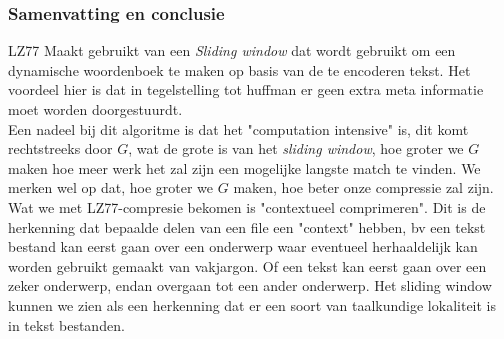 \documentclass[10pt,a4paper]{report}
\begin{document}
\subsubsection*{Samenvatting en conclusie}
LZ77 Maakt gebruikt van een \emph{Sliding window} dat wordt gebruikt om een dynamische woordenboek te maken op basis van de te encoderen tekst. Het voordeel hier is dat in tegelstelling tot huffman er geen extra meta informatie moet worden doorgestuurdt.\\

Een nadeel bij dit algoritme is dat het "computation intensive" is, dit komt rechtstreeks door $G$, wat de grote is van het \emph{sliding window}, hoe groter we $G$ maken hoe meer werk het zal zijn een mogelijke langste match te vinden. We merken wel op dat, hoe groter we $G$ maken, hoe beter onze compressie zal zijn.\\

Wat we met LZ77-compresie bekomen is "contextueel comprimeren". Dit is de herkenning dat bepaalde delen van een file een "context" hebben, bv een tekst bestand kan eerst gaan over een onderwerp waar eventueel herhaaldelijk	kan worden gebruikt gemaakt van vakjargon. Of een tekst kan eerst gaan over een zeker onderwerp, endan overgaan tot een ander onderwerp. Het sliding window kunnen we zien als een herkenning dat er een soort van taalkundige lokaliteit is in tekst bestanden.
\end{document}

